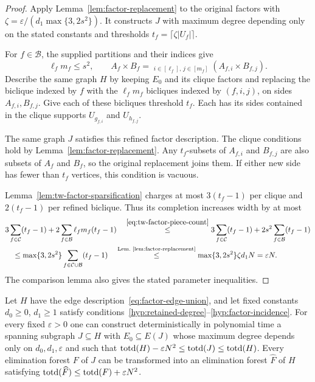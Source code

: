 \begin{proof}
Apply Lemma~\ref{lem:factor-replacement} to the original factors
with $\zeta=\varepsilon/(d_1\max\{3,2s^2\})$. It constructs $J$
with maximum degree depending only on the stated constants and
thresholds $t_f=\lceil\zeta|U_f|\rceil$.

For $f\in\mathcal B$, the supplied partitions and their indices give
\begin{equation}\label{eq:tw-factor-piece-count}
 \ell_fm_f\leq s^2,\qquad
 A_f\times B_f=\mathop{\dot\bigcup}_{i\in[\ell_f],\,j\in[m_f]}
 (A_{f,i}\times B_{f,j}).
\end{equation}
Describe the same graph $H$ by keeping $E_0$ and its clique
factors and replacing the biclique indexed by $f$ with the
$\ell_fm_f$ bicliques indexed by $(f,i,j)$, on sides
$A_{f,i},B_{f,j}$. Give each of these bicliques threshold $t_f$.
Each has its sides contained in the clique supports $U_{g_{f,i}}$
and $U_{h_{f,j}}$.

The same graph $J$ satisfies this refined factor description. The
clique conditions hold by Lemma~\ref{lem:factor-replacement}.
Any $t_f$-subsets of $A_{f,i}$ and $B_{f,j}$ are also subsets of
$A_f$ and $B_f$, so the original replacement joins them. If either
new side has fewer than $t_f$ vertices, this condition is vacuous.

Lemma~\ref{lem:tw-factor-sparsification} charges at most $3(t_f-1)$
per clique and $2(t_f-1)$ per refined biclique. Thus its completion
increases width by at most
\[
\begin{aligned}
 &3\sum_{f\in\mathcal C}(t_f-1)
 +2\sum_{f\in\mathcal B}\ell_fm_f(t_f-1)
 \quad\overset{\eqref{eq:tw-factor-piece-count}}{\leq}
 3\sum_{f\in\mathcal C}(t_f-1)
       +2s^2\sum_{f\in\mathcal B}(t_f-1)\\
 &\quad\le\max\{3,2s^2\}\sum_{f\in\mathcal C\cup\mathcal B}(t_f-1)
 \quad\overset{\text{Lem.~\ref{lem:factor-replacement}}}{\leq}
 \max\{3,2s^2\}\zeta d_1N=\varepsilon N.
\end{aligned}
\]
The comparison lemma also gives the stated parameter inequalities.
\end{proof}

\begin{theorem}
\label{thm:total-depth-sparsification}
Let $H$ have the edge description~\eqref{eq:factor-edge-union},
and let fixed constants $d_0\ge0$, $d_1\ge1$ satisfy
conditions~\ref{hyp:retained-degree}--\ref{hyp:factor-incidence}.
For every fixed $\varepsilon>0$
one can construct deterministically in polynomial time a spanning
subgraph $J\subseteq H$ with $E_0\subseteq E(J)$ whose maximum degree depends only on
$d_0,d_1,\varepsilon$ and such that
$\operatorname{totd}(H)-\varepsilon N^2\le\operatorname{totd}(J)\le\operatorname{totd}(H)$.
Every elimination forest $F$ of $J$ can be transformed into an
elimination forest $\widehat F$ of $H$ satisfying
$\operatorname{totd}(\widehat F)\le\operatorname{totd}(F)+\varepsilon N^2$.
\end{theorem}

